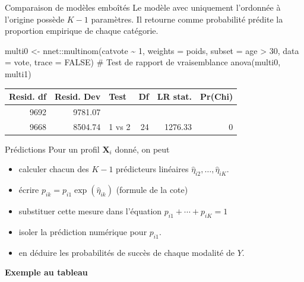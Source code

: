 \documentclass[
  ignorenonframetext,
]{beamer}
\newenvironment{Shaded}{\begin{snugshade}}{\end{snugshade}}
\newcommand{\AttributeTok}[1]{\textcolor[rgb]{0.40,0.45,0.13}{#1}}
\newcommand{\CommentTok}[1]{\textcolor[rgb]{0.37,0.37,0.37}{#1}}
\newcommand{\ConstantTok}[1]{\textcolor[rgb]{0.56,0.35,0.01}{#1}}
\newcommand{\DecValTok}[1]{\textcolor[rgb]{0.68,0.00,0.00}{#1}}
\newcommand{\FunctionTok}[1]{\textcolor[rgb]{0.28,0.35,0.67}{#1}}
\newcommand{\NormalTok}[1]{\textcolor[rgb]{0.00,0.23,0.31}{#1}}
\newcommand{\OtherTok}[1]{\textcolor[rgb]{0.00,0.23,0.31}{#1}}
\newcommand{\SpecialCharTok}[1]{\textcolor[rgb]{0.37,0.37,0.37}{#1}}
\providecommand{\tightlist}{%
  \setlength{\itemsep}{0pt}\setlength{\parskip}{0pt}}\usepackage{longtable,booktabs,array}
\begin{document}
\begin{frame}[fragile]{Comparaison de modèles emboîtés}
\protect\hypertarget{comparaison-de-moduxe8les-embouxeetuxe9s}{}
Le modèle avec uniquement l'ordonnée à l'origine possède \(K-1\)
paramètres. Il retourne comme probabilité prédite la proportion
empirique de chaque catégorie.

\begin{Shaded}
\begin{Highlighting}[numbers=left,,]
\NormalTok{multi0 }\OtherTok{\textless{}{-}}\NormalTok{ nnet}\SpecialCharTok{::}\FunctionTok{multinom}\NormalTok{(catvote }\SpecialCharTok{\textasciitilde{}} \DecValTok{1}\NormalTok{,}
                         \AttributeTok{weights =}\NormalTok{ poids,}
             \AttributeTok{subset =}\NormalTok{ age }\SpecialCharTok{\textgreater{}} \DecValTok{30}\NormalTok{,}
                         \AttributeTok{data =}\NormalTok{ vote,}
                         \AttributeTok{trace =} \ConstantTok{FALSE}\NormalTok{)}
\CommentTok{\# Test de rapport de vraisemblance}
\FunctionTok{anova}\NormalTok{(multi0, multi1)}
\end{Highlighting}
\end{Shaded}

\begin{longtable}[]{@{}rrlrrr@{}}
\toprule()
Resid. df & Resid. Dev & Test & Df & LR stat. & Pr(Chi) \\
\midrule()
\endhead
9692 & 9781.07 & & & & \\
9668 & 8504.74 & 1 vs 2 & 24 & 1276.33 & 0 \\
\bottomrule()
\end{longtable}
\end{frame}

\begin{frame}{Prédictions}
\protect\hypertarget{pruxe9dictions}{}
Pour un profil \(\mathbf{X}_i\) donné, on peut

\begin{itemize}
\tightlist
\item
  calculer chacun des \(K-1\) prédicteurs linéaires
  \(\widehat{\eta}_{i2}, \ldots, \widehat{\eta}_{iK}\).
\item
  écrire \(p_{ik} = p_{i1}\exp(\widehat{\eta}_{ik})\) (formule de la
  cote)
\item
  substituer cette mesure dans l'équation \(p_{i1} + \cdots + p_{iK}=1\)
\item
  isoler la prédiction numérique pour \(p_{i1}\).
\item
  en déduire les probabilités de succès de chaque modalité de \(Y\).
\end{itemize}

\textbf{Exemple au tableau}
\end{frame}
\end{document}
